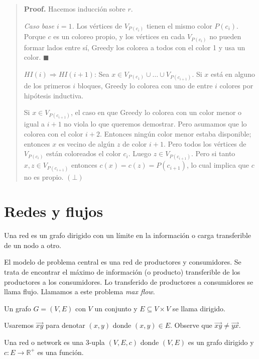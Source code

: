 \documentclass[a4paper, 12pt]{article}
\begin{document}
\small
\begin{quote}

\textbf{Proof.} Hacemos inducción sobre $r$. 

\textit{Caso base $i = 1$.} Los vértices de $V_{P(c_i)}$ tienen el mismo color $P(c_i)$.
Porque $c$ es un coloreo propio, y los vértices en cada $V_{P(c_i)}$ no pueden
formar lados entre sí, Greedy los colorea a todos con el color 1 y usa un color.
$\blacksquare$


$HI(i) \Rightarrow HI(i+1)$: Sea $x \in V_{P(c_1)} \cup  \ldots \cup
V_{P(c_{i+1})}$. Si $x$ está en alguno de los primeros $i$ bloques, Greedy lo
colorea con uno de entre $i$ colores por hipótesis inductiva. 

Si $x \in V_{P(c_{i+1})}$, el
caso en que Greedy lo colorea con un color menor o igual a $i + 1$ no viola lo
que queremos demostrar. Pero asumamos que lo colorea con el color $i +
2$. Entonces ningún color menor estaba disponible; entonces $x$ es vecino de
algún $z$ de color $i + 1$. Pero todos los vértices de $V_{P(c_{i})}$ están
coloreados el color $c_i$. Luego $z \in V_{P(c_{i+1})}$. Pero si
tanto $x, z \in V_{P(c_{i+1})}$ entonces $c(x) = c(z) = P(c_{i+1})$, lo cual
implica que $c$ no es propio. $(\bot)$

\end{quote}
\normalsize

\pagebreak 

\section{Redes y flujos}

Una red es un grafo dirigido con un límite en la información o carga
transferible de un nodo a otro. 

El modelo de problema central es una red de productores y
consumidores. Se trata de encontrar el máximo de información (o producto)
transferible de los productores a los consumidores. Lo transferido de
productores a consumidores se llama flujo. Llamamos a este problema \textit{max
flow}.

\begin{definition}
    Un grafo $G = (V, E) $ con $V$ un conjunto y $E \subseteq V \times V$ se
    llama dirigido.
\end{definition}

Usaremos $\overrightarrow{xy}$ para denotar $(x, y)$ donde $(x, y) \in E$. Observe que
$\overrightarrow{xy} \neq \overrightarrow{yx}$.

\begin{definition}
    Una red o network es una $3$-upla $(V, E, c)$ donde $(V, E)$ es un grafo
    dirigido y $c : E \to \mathbb{R}^{+}$ es una función.
\end{definition}
\end{document}
